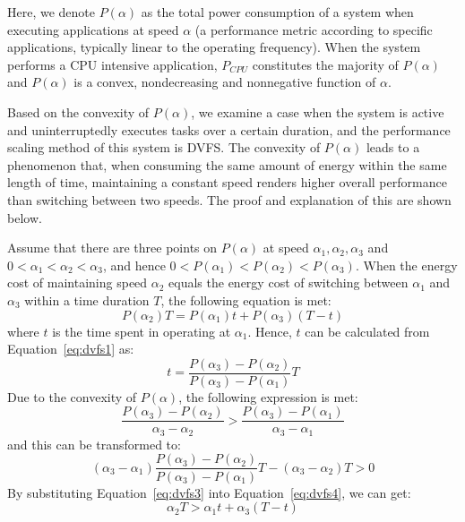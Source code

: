 Here, we denote $P(\alpha)$ as the total power consumption of a system when executing applications at speed $\alpha$ (a performance metric according to specific applications, typically linear to the operating frequency). When the system performs a CPU intensive application, $P_{CPU}$ constitutes the majority of $P(\alpha)$ and $P(\alpha)$ is a convex, nondecreasing and nonnegative function of $\alpha$.

Based on the convexity of $P(\alpha)$, we examine a case when the system is active and uninterruptedly executes tasks over a certain duration, and the performance scaling method of this system is DVFS. The convexity of $P(\alpha)$ leads to a phenomenon that, when consuming the same amount of energy within the same length of time, maintaining a constant speed renders higher overall performance than switching between two speeds. The proof and explanation of this are shown below. 

Assume that there are three points on $P(\alpha)$ at speed $\alpha_1,\alpha_2,\alpha_3$ and $0 < \alpha_1 < \alpha_2 < \alpha_3$, and hence $0 < P(\alpha_1) < P(\alpha_2) < P(\alpha_3)$. When the energy cost of maintaining speed $\alpha_2$ equals the energy cost of switching between $\alpha_1$ and $\alpha_3$ within a time duration $T$, the following equation is met:
\begin{equation} \label{eq:dvfs1}
    P(\alpha_2)T = P(\alpha_1)t + P(\alpha_3)(T-t)
\end{equation}
where $t$ is the time spent in operating at $\alpha_1$. Hence, $t$ can be calculated from Equation~\ref{eq:dvfs1} as:
\begin{equation} \label{eq:dvfs2}
    t = \frac{P(\alpha_3)-P(\alpha_2)}{P(\alpha_3)-P(\alpha_1)} T
\end{equation}
Due to the convexity of $P(\alpha)$, the following expression is met:
\begin{equation} \label{eq:dvfs3}
    \frac{P(\alpha_3)-P(\alpha_2)}{\alpha_3-\alpha_2} > \frac{P(\alpha_3)-P(\alpha_1)}{\alpha_3-\alpha_1}
\end{equation}
and this can be transformed to:
\begin{equation} \label{eq:dvfs4}
    (\alpha_3 - \alpha_1) \frac{P(\alpha_3) - P(\alpha_2)}{P(\alpha_3) - P(\alpha_1)} T - (\alpha_3 - \alpha_2) T > 0
\end{equation}
By substituting Equation~\ref{eq:dvfs3} into Equation~\ref{eq:dvfs4}, we can get:
\begin{equation} \label{eq:dvfs5}
    \alpha_2 T > \alpha_1 t + \alpha_3 (T - t)
\end{equation}

